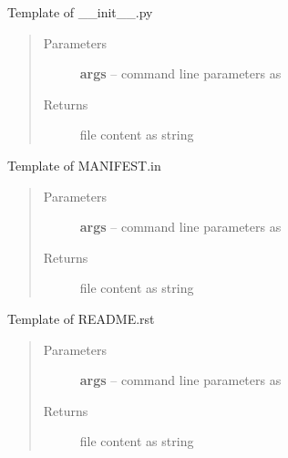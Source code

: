 \documentclass[letterpaper,10pt,english]{sphinxmanual}
\begin{document}

\begin{fulllineitems}
\label{_rst/pyscaffold:pyscaffold.templates.init}
Template of \_\_init\_\_.py
\begin{quote}\begin{description}
\item[{Parameters}] \leavevmode
\textbf{args} -- command line parameters as \href{http://docs.python.org/2.7/library/argparse.html\#argparse.Namespace}{}

\item[{Returns}] \leavevmode
file content as string

\end{description}\end{quote}

\end{fulllineitems}


\begin{fulllineitems}
\label{_rst/pyscaffold:pyscaffold.templates.manifest_in}
Template of MANIFEST.in
\begin{quote}\begin{description}
\item[{Parameters}] \leavevmode
\textbf{args} -- command line parameters as \href{http://docs.python.org/2.7/library/argparse.html\#argparse.Namespace}{}

\item[{Returns}] \leavevmode
file content as string

\end{description}\end{quote}

\end{fulllineitems}


\begin{fulllineitems}
\label{_rst/pyscaffold:pyscaffold.templates.readme}
Template of README.rst
\begin{quote}\begin{description}
\item[{Parameters}] \leavevmode
\textbf{args} -- command line parameters as \href{http://docs.python.org/2.7/library/argparse.html\#argparse.Namespace}{}

\item[{Returns}] \leavevmode
file content as string

\end{description}\end{quote}

\end{fulllineitems}
\end{document}
